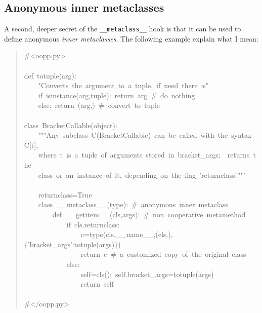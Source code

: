 \documentclass[10pt,english]{article}
\begin{document}

\hypertarget{anonymous-inner-metaclasses}{}
\subsection*{Anonymous inner metaclasses}

A second, deeper secret of the \texttt{{\_}{\_}metaclass{\_}{\_}} hook is that it can be
used to define anonymous \emph{inner metaclasses}. The following example
explain what I mean:
\begin{quote}
\begin{ttfamily}\begin{flushleft}
\mbox{{\#}<oopp.py>}\\
\mbox{}\\
\mbox{def~totuple(arg):}\\
\mbox{~~~~"Converts~the~argument~to~a~tuple,~if~need~there~is"}\\
\mbox{~~~~if~isinstance(arg,tuple):~return~arg~{\#}~do~nothing}\\
\mbox{~~~~else:~return~(arg,)~{\#}~convert~to~tuple}\\
\mbox{}\\
\mbox{class~BracketCallable(object):}\\
\mbox{~~~~"""Any~subclass~C(BracketCallable)~can~be~called~with~the~syntax~C[t],~}\\
\mbox{~~~~where~t~is~a~tuple~of~arguments~stored~in~bracket{\_}args;~~returns~the~}\\
\mbox{~~~~class~or~an~instance~of~it,~depending~on~the~flag~'returnclass'."""}\\
\mbox{}\\
\mbox{~~~~returnclass=True}\\
\mbox{~~~~class~{\_}{\_}metaclass{\_}{\_}(type):~{\#}~anonymous~inner~metaclass}\\
\mbox{~~~~~~~~def~{\_}{\_}getitem{\_}{\_}(cls,args):~{\#}~non~cooperative~metamethod}\\
\mbox{~~~~~~~~~~~~if~cls.returnclass:~}\\
\mbox{~~~~~~~~~~~~~~~~c=type(cls.{\_}{\_}name{\_}{\_},(cls,),{\{}'bracket{\_}args':totuple(args){\}})}\\
\mbox{~~~~~~~~~~~~~~~~return~c~{\#}~a~customized~copy~of~the~original~class}\\
\mbox{~~~~~~~~~~~~else:}\\
\mbox{~~~~~~~~~~~~~~~~self=cls();~self.bracket{\_}args=totuple(args)}\\
\mbox{~~~~~~~~~~~~~~~~return~self}\\
\mbox{}\\
\mbox{{\#}</oopp.py>}
\end{flushleft}\end{ttfamily}
\end{quote}
\end{document}
